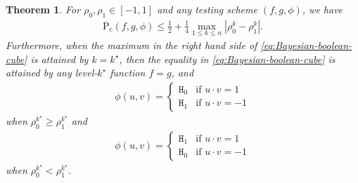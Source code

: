 \documentclass[journal,draftcls, onecolumn]{IEEEtran}
\newtheorem{theorem}{Theorem}
\newcommand{\rom}[1]{\mathrm{#1}}
\newcommand{\Pc}{\rom{P}_{\rom{c}}}
\begin{document}
\begin{theorem} \label{theorem:Bayesian-Boolean}
For $\rho_0, \rho_1 \in [-1,1]$ and any testing scheme $(f,g,\phi)$, we have
\begin{align} \label{eq:Bayesian-boolean-cube}
\Pc(f,g,\phi) \le \frac{1}{2} + \frac{1}{4} \max_{1\le k \le n} | \rho_0^k - \rho_1^k|.
\end{align}
Furthermore, when the maximum in the right hand side of \eqref{eq:Bayesian-boolean-cube}
is attained by $k=k^\star$, then the equality in \eqref{eq:Bayesian-boolean-cube} is attained 
by any level-$k^\star$ function $f=g$, and 
\begin{align}
\phi(u,v) = \left\{
\begin{array}{ll}
\mathtt{H}_0 & \mbox{if } u\cdot v = 1 \\
\mathtt{H}_1 & \mbox{if } u \cdot v = -1
\end{array}
\right. \label{eq:Bayesian-decision-1}
\end{align}
when $\rho_0^{k^\star} \ge \rho_1^{k^\star}$ and
\begin{align}
\phi(u,v) = \left\{
\begin{array}{ll}
\mathtt{H}_1 & \mbox{if } u\cdot v = 1 \\
\mathtt{H}_0 & \mbox{if } u \cdot v = -1
\end{array}
\right. \label{eq:Bayesian-decision-2}
\end{align}
when $\rho_0^{k^\star} < \rho_1^{k^\star}$.
\end{theorem}
\end{document}

